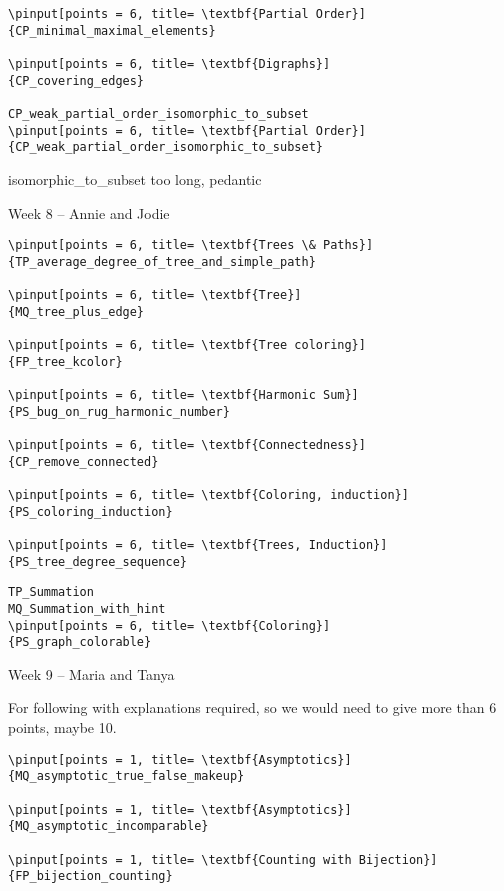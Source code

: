\documentclass[quiz]{mcs}
\begin{document}
\begin{staffnotes}
\begin{verbatim}
\pinput[points = 6, title= \textbf{Partial Order}]
{CP_minimal_maximal_elements}

\pinput[points = 6, title= \textbf{Digraphs}]
{CP_covering_edges}

CP_weak_partial_order_isomorphic_to_subset
\pinput[points = 6, title= \textbf{Partial Order}]
{CP_weak_partial_order_isomorphic_to_subset}
\end{verbatim}
isomorphic\_to\_subset too long, pedantic

\begin{center}
{\large Week 8 -- Annie and Jodie}
\end{center}
\begin{verbatim}
\pinput[points = 6, title= \textbf{Trees \& Paths}]
{TP_average_degree_of_tree_and_simple_path}

\pinput[points = 6, title= \textbf{Tree}]
{MQ_tree_plus_edge}

\pinput[points = 6, title= \textbf{Tree coloring}]
{FP_tree_kcolor}

\pinput[points = 6, title= \textbf{Harmonic Sum}]
{PS_bug_on_rug_harmonic_number}

\pinput[points = 6, title= \textbf{Connectedness}]
{CP_remove_connected}

\pinput[points = 6, title= \textbf{Coloring, induction}]
{PS_coloring_induction}

\pinput[points = 6, title= \textbf{Trees, Induction}]
{PS_tree_degree_sequence}
\end{verbatim}

\begin{verbatim}
TP_Summation
MQ_Summation_with_hint
\pinput[points = 6, title= \textbf{Coloring}]
{PS_graph_colorable}
\end{verbatim}

\begin{center}
{\large Week 9 -- Maria and Tanya}
\end{center}

For following with explanations required, so we would need to give
more than 6 points, maybe 10.
\begin{verbatim}
\pinput[points = 1, title= \textbf{Asymptotics}]
{MQ_asymptotic_true_false_makeup} 

\pinput[points = 1, title= \textbf{Asymptotics}]
{MQ_asymptotic_incomparable}

\pinput[points = 1, title= \textbf{Counting with Bijection}]
{FP_bijection_counting}


\end{verbatim}
\end{staffnotes}
\end{document}
